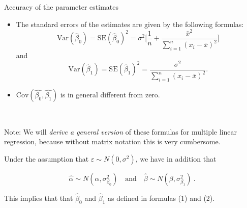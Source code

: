 \documentclass[10pt,ignorenonframetext,]{beamer}
\begin{document}
\begin{frame}

\begin{block}{Accuracy of the parameter estimates}

\vspace{2mm}

\begin{itemize}
\item
  The standard errors of the estimates are given by the following
  formulas:
  \[\text{Var}(\hat{\beta}_0)=\text{SE}(\hat{\beta}_0)^2 = \sigma^2 \Big [ \frac{1}{n} + \frac{\bar{x}^2}{\sum_{i=1}^n (x_i -\bar{x})^2} \Big]\]
  and
  \[\text{Var}(\hat{\beta}_1)=\text{SE}(\hat{\beta}_1)^2 = \frac{\sigma^2}{\sum_{i=1}^n (x_i-\bar{x})^2}.\]
\item
  \(\text{Cov}(\hat{\beta_0},\hat{\beta_1})\) is in general different
  from zero.
\end{itemize}

\(~\)

\tiny
Note: We will \emph{derive a general version} of these formulas for
multiple linear regression, because without matrix notation this is very
cumbersome.

\end{block}

\end{frame}

\begin{frame}

Under the assumption that \(\varepsilon \sim N(0,\sigma^2)\), we have in
addition that

\[
 \hat\alpha \sim N(\alpha,{\sigma^{2}_{\beta_0}}) \quad \text{and} \quad \hat\beta \sim N(\beta,{\sigma^{2}_{\beta_1}}) \ .
\]

This implies that that \(\hat\beta_0\) and \(\hat\beta_1\) as defined in
formulas (1) and (2).

\end{frame}
\end{document}
